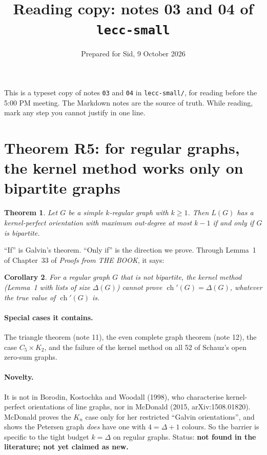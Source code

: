 \documentclass[11pt]{article}
\title{Reading copy: notes 03 and 04 of \texttt{lecc-small}}
\author{Prepared for Sid, 9 October 2026}
\date{}
\theoremstyle{plain}
\newtheorem{theorem}{Theorem}
\newtheorem{corollary}[theorem]{Corollary}
\theoremstyle{definition}
\newcommand{\ch}{\operatorname{ch}}
\begin{document}
\maketitle

\noindent This is a typeset copy of notes \texttt{03} and \texttt{04} in \texttt{lecc-small/}, for reading before the 5:00 PM meeting. The
Markdown notes are the source of truth. While reading, mark any step you cannot justify in
one line.

\section{Theorem R5: for regular graphs, the kernel method works only on bipartite graphs}

\begin{theorem}
Let $G$ be a simple $k$-regular graph with $k \ge 1$. Then $L(G)$ has a kernel-perfect
orientation with maximum out-degree at most $k-1$ if and only if $G$ is bipartite.
\end{theorem}

``If'' is Galvin's theorem. ``Only if'' is the direction we prove. Through Lemma~1 of
Chapter~33 of \emph{Proofs from THE BOOK}, it says:

\begin{corollary}
For a regular graph $G$ that is not bipartite, the kernel method (Lemma~1 with lists of size
$\Delta(G)$) cannot prove $\ch'(G) = \Delta(G)$, whatever the true value of $\ch'(G)$ is.
\end{corollary}

\paragraph{Special cases it contains.} The triangle theorem (note 11), the even complete graph
theorem (note 12), the case $C_5 \times K_2$, and the failure of the kernel method on all 52 of
Schauz's open zero-sum graphs.

\paragraph{Novelty.} It is not in Borodin, Kostochka and Woodall (1998), who characterise
kernel-perfect orientations of line graphs, nor in McDonald (2015, arXiv:1508.01820). McDonald
proves the $K_n$ case only for her restricted ``Galvin orientations'', and shows the Petersen
graph \emph{does} have one with $4 = \Delta + 1$ colours. So the barrier is specific to the
tight budget $k = \Delta$ on regular graphs. Status: \textbf{not found in the literature; not
yet claimed as new.}
\end{document}
